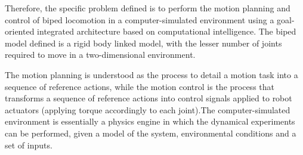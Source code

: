 Therefore, the specific problem defined is to perform the motion
planning and control of biped locomotion in a computer-simulated
environment using a goal-oriented integrated architecture based on
computational intelligence. The biped model defined is a rigid body
linked model, with the lesser number of joints required to move in a
two-dimensional environment.


The motion planning is understood as the process to detail a motion
task into a sequence of reference actions, while the motion control is
the process that transforms a sequence of reference actions into
control signals applied to robot actuators (applying torque
accordingly to each joint).The computer-simulated environment is
essentially a physics engine in which the dynamical experiments can be
performed, given a model of the system, environmental conditions and a
set of inputs.







